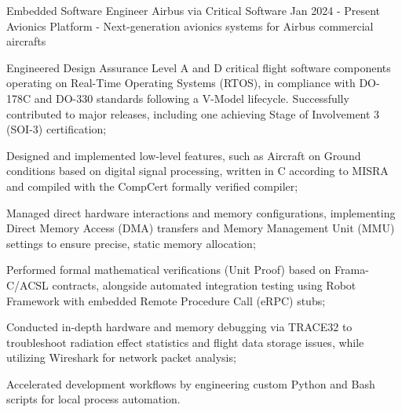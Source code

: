 

\begin{cventries}

  \cventry
    {Embedded Software Engineer} %
    {Airbus via Critical Software} %
    {} %
    {Jan 2024 - Present} %
    {Avionics Platform - Next-generation avionics systems for Airbus commercial aircrafts} %
    {
    \begin{cvitems} %
	\item {Engineered Design Assurance Level A and D critical flight software components operating on Real-Time Operating Systems (RTOS), in compliance with DO-178C and DO-330 standards following a V-Model lifecycle. Successfully contributed to major releases, including one achieving Stage of Involvement 3 (SOI-3) certification;}
	\item {Designed and implemented low-level features, such as Aircraft on Ground conditions based on digital signal processing, written in C according to MISRA and compiled with the CompCert formally verified compiler;}
	\item {Managed direct hardware interactions and memory configurations, implementing Direct Memory Access (DMA) transfers and Memory Management Unit (MMU) settings to ensure precise, static memory allocation;}
	\item {Performed formal mathematical verifications (Unit Proof) based on Frama-C/ACSL contracts, alongside automated integration testing using Robot Framework with embedded Remote Procedure Call (eRPC) stubs;}
	\item {Conducted in-depth hardware and memory debugging via TRACE32 to troubleshoot radiation effect statistics and flight data storage issues, while utilizing Wireshark for network packet analysis;}
	\item {Accelerated development workflows by engineering custom Python and Bash scripts for local process automation.}
      \end{cvitems}
    }


\end{cventries}
